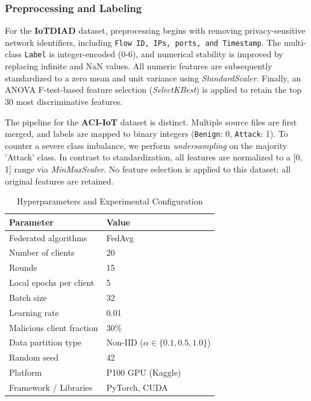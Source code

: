 \subsubsection{Preprocessing and Labeling}
\label{sec:preprocessing}

For the \textbf{IoTDIAD} dataset, preprocessing begins with removing privacy-sensitive network identifiers, including \texttt{Flow ID, IPs, ports, and Timestamp}. The multi-class \texttt{Label} is integer-encoded (0-6), and numerical stability is improved by replacing infinite and NaN values. All numeric features are subsequently standardized to a zero mean and unit variance using \textit{StandardScaler}. Finally, an ANOVA F-test-based feature selection (\textit{SelectKBest}) is applied to retain the top 30 most discriminative features.

The pipeline for the \textbf{ACI-IoT} dataset is distinct. Multiple source files are first merged, and labels are mapped to binary integers (\texttt{Benign}: 0, \texttt{Attack}: 1). To counter a severe class imbalance, we perform \textit{undersampling} on the majority 'Attack' class. In contrast to standardization, all features are normalized to a [0, 1] range via \textit{MinMaxScaler}. No feature selection is applied to this dataset; all original features are retained.

\label{sec:training-config}

\begin{table}[h!]
\caption{Hyperparameters and Experimental Configuration}
\centering
\begin{tabular}{ll}
\toprule
\textbf{Parameter} & \textbf{Value} \\
\midrule
Federated algorithms & FedAvg \\
Number of clients & 20 \\
Rounds & 15 \\
Local epochs per client & 5 \\
Batch size & 32 \\
Learning rate & 0.01 \\
Malicious client fraction & 30\% \\
Data partition type & Non-IID ($\alpha \in \{0.1, 0.5, 1.0\}$) \\
Random seed & 42 \\
Platform & P100 GPU (Kaggle) \\
Framework / Libraries & PyTorch, CUDA \\
\bottomrule
\end{tabular}
\label{tab:hyperparameters}
\end{table}


